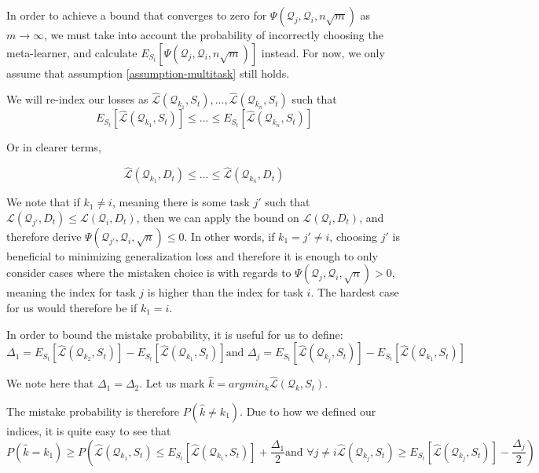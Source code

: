 \documentclass[letterpaper]{article}
\theoremstyle{definition}
\begin{document}
In order to achieve a bound that converges to zero for $\Psi(\mathcal{Q}_j, \mathcal{Q}_i, n\sqrt{m})$ as $m\rightarrow\infty$, we must take into account the probability of incorrectly choosing the meta-learner, and calculate $E_{S_t} \left [\Psi(\mathcal{Q}_j, \mathcal{Q}_i, n\sqrt{m}) \right ]$ instead. For now, we only assume that assumption \ref{assumption-multitask} still holds.

We will re-index our losses as $\hat{\mathcal{L}}(\mathcal{Q}_{k_1}, S_t), ..., \hat{\mathcal{L}}(\mathcal{Q}_{k_n}, S_t)$ such that $$E_{S_t}\left [\hat{\mathcal{L}}(\mathcal{Q}_{k_1}, S_t)\right ]\leq ... \leq E_{S_t}\left [\hat{\mathcal{L}}(\mathcal{Q}_{k_n}, S_t)\right ]$$

Or in clearer terms,

$$\hat{\mathcal{L}}(\mathcal{Q}_{k_1}, D_t)\leq ... \leq \hat{\mathcal{L}}(\mathcal{Q}_{k_n}, D_t)$$

We note that if $k_1\neq i$, meaning there is some task $j'$ such that $\mathcal{L}(\mathcal{Q}_{j'}, D_t)\leq \mathcal{L}(\mathcal{Q}_{i}, D_t)$, then we can apply the bound on $\mathcal{L}(\mathcal{Q}_{i}, D_t)$, and therefore derive $\Psi(\mathcal{Q}_{j'}, \mathcal{Q}_i, \sqrt{n})\leq 0$.
In other words, if $k_1=j'\neq i$, choosing $j'$ is beneficial to minimizing generalization loss and therefore it is enough to only consider cases where the mistaken choice is with regards to $\Psi(\mathcal{Q}_{j}, \mathcal{Q}_i, \sqrt{n})> 0$, meaning the index for task $j$ is higher than the index for task $i$. The hardest case for us would therefore be if $k_1=i$.

In order to bound the mistake probability, it is useful for us to define:
$$ \Delta_1=E_{S_t}\left [ \hat{\mathcal{L}}(\mathcal{Q}_{k_2}, S_t)\right ]-E_{S_t}\left [ \hat{\mathcal{L}}(\mathcal{Q}_{k_1}, S_t)\right ] \text{and } \Delta_j=E_{S_t}\left [ \hat{\mathcal{L}}(\mathcal{Q}_{k_j}, S_t)\right ]-E_{S_t}\left [ \hat{\mathcal{L}}(\mathcal{Q}_{k_{1}}, S_t)\right ]$$

We note here that $\Delta_1=\Delta_2$. Let us mark $\hat{k}=argmin_{k} \hat{\mathcal{L}}(\mathcal{Q}_{k}, S_t)$.

The mistake probability is therefore $P(\hat{k}\neq k_1)$.
Due to how we defined our indices, it is quite easy to see that 
$$ P(\hat{k}=k_1) \geq P\left(\hat{\mathcal{L}}(\mathcal{Q}_{k_1}, S_t)\leq E_{S_t}\left [ \hat{\mathcal{L}}(\mathcal{Q}_{k_1}, S_t)\right ]+\frac{\Delta_1}{2} \text{and } \forall j\neq i \hat{\mathcal{L}}(\mathcal{Q}_{k_j}, S_t)\geq E_{S_t}\left [ \hat{\mathcal{L}}(\mathcal{Q}_{k_j}, S_t)\right ]-\frac{\Delta_j}{2}\right )$$
\end{document}
